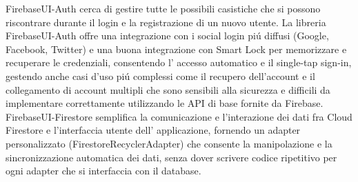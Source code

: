 FirebaseUI-Auth cerca di gestire tutte le possibili casistiche che si possono riscontrare durante il login e la registrazione di un nuovo utente.
La libreria FirebaseUI-Auth offre una integrazione con i social login pi\'u diffusi (Google, Facebook, Twitter) e una buona integrazione con Smart Lock per memorizzare e recuperare le credenziali, consentendo l' accesso automatico e il single-tap sign-in, gestendo anche casi d'uso pi\'u complessi come il recupero dell'account e il collegamento di account multipli che sono sensibili alla sicurezza e difficili da implementare correttamente utilizzando le API di base fornite da Firebase.\\
FirebaseUI-Firestore semplifica la comunicazione e l'interazione dei dati fra Cloud Firestore e l'interfaccia utente dell' applicazione, fornendo un adapter personalizzato (FirestoreRecyclerAdapter) che consente la manipolazione e la sincronizzazione automatica dei dati, senza dover scrivere codice ripetitivo per ogni adapter che si interfaccia con il database.
\clearpage{\pagestyle{empty}\cleardoublepage}
